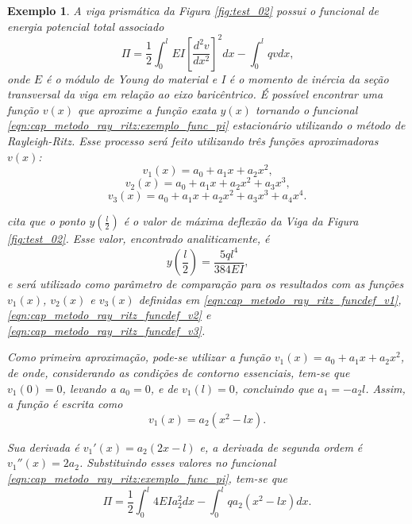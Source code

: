 \documentclass[
	12pt,				%
	openright,			%
    twoside,			%
	a4paper,			%
	english,			%
	french,				%
	spanish,			%
	brazil				%
	]{abntex2}
\newtheorem{exemplo}{Exemplo}
\numberwithin{lema}{chapter}
\numberwithin{teorema}{chapter}
\numberwithin{definicao}{chapter}
\numberwithin{exemplo}{chapter}
\numberwithin{figure}{chapter}
\begin{document}
\begin{exemplo}
	A viga prismática da Figura \ref{fig:test_02} possui o funcional de energia potencial total associado
	\begin{equation}
		\label{eqn:cap_metodo_ray_ritz:exemplo_func_pi}
		\Pi = 
		\frac{1}{2} \int_0^l EI \left [
			\frac{d^2v}{dx^2}
		\right ]^2 dx
		-
		\int_0^l qvdx
		\text{,}
	\end{equation}
	onde $E$ é o módulo de Young do material e I é o momento de inércia da seção transversal da viga em relação ao eixo baricêntrico. É possível encontrar uma função $v(x)$ que aproxime a função exata $y(x)$ tornando o funcional \eqref{eqn:cap_metodo_ray_ritz:exemplo_func_pi} estacionário utilizando o método de Rayleigh-Ritz. Esse processo será feito utilizando três funções aproximadoras $v(x)$:
	\begin{equation}
		\label{eqn:cap_metodo_ray_ritz_funcdef_v1}
		v_1 (x) = a_0 + a_1 x + a_2 x^2
		\text{,}
	\end{equation}
	\begin{equation}
		\label{eqn:cap_metodo_ray_ritz_funcdef_v2}
		v_2 (x) = a_0 + a_1 x + a_2 x^2 + a_3 x^3
		\text{,}
	\end{equation}
	\begin{equation}
		\label{eqn:cap_metodo_ray_ritz_funcdef_v3}
		v_3 (x) = a_0 + a_1 x + a_2 x^2 + a_3 x^3 + a_4 x^4
		\text{.}
	\end{equation}
	
	 cita que o ponto $y(\frac{l}{2})$ é o valor de máxima deflexão da Viga da Figura \ref{fig:test_02}. Esse valor, encontrado analiticamente, é
	\begin{equation}
		\label{eqn:cap_metodo_ray_ritz:ex1_max_deflex_exato}
		y(\frac{l}{2})=\frac{5ql^4}{384EI}
		\text{,}
	\end{equation}
	e será utilizado como parâmetro de comparação para os resultados com as funções $v_1(x)$, $v_2(x)$ e $v_3(x)$ definidas em \eqref{eqn:cap_metodo_ray_ritz_funcdef_v1}, \eqref{eqn:cap_metodo_ray_ritz_funcdef_v2} e \eqref{eqn:cap_metodo_ray_ritz_funcdef_v3}.
	
	Como primeira aproximação, pode-se utilizar a função $v_1(x)=a_0+a_1x+a_2x^2$, de onde, considerando as condições de contorno essenciais, tem-se que $v_1(0)=0$, levando a $a_0=0$, e de $v_1(l)=0$, concluindo que $a_1=-a_2l$. Assim, a função é escrita como
	$$
		v_1(x)=a_2(x^2-lx)
		\text{.}
	$$
	
	Sua derivada é $v_1'(x)=a_2(2x-l)$ e, a derivada de segunda ordem é $v_1''(x)=2a_2$. Substituindo esses valores no funcional \eqref{eqn:cap_metodo_ray_ritz:exemplo_func_pi}, tem-se que
	$$
		\Pi =
		\frac{1}{2}
		\int_0^l 4 EI a_2 ^2 dx
		-
		\int_0^l q a_2 (x^2-lx) dx
		\text{.}
	$$
	

\end{exemplo}
\end{document}
